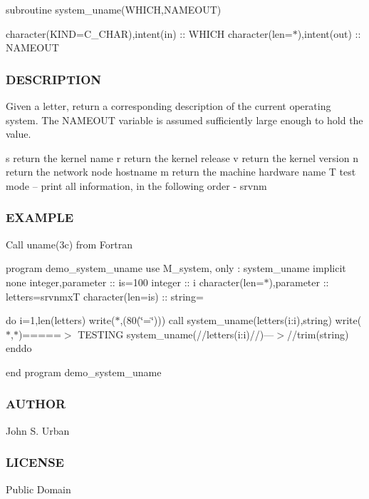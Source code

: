 subroutine system\+\_\+uname(\+W\+H\+I\+C\+H,\+N\+A\+M\+E\+O\+U\+T)

character(K\+I\+ND=C\+\_\+\+C\+H\+AR),intent(in) \+:\+: W\+H\+I\+CH character(len=$\ast$),intent(out) \+:\+: N\+A\+M\+E\+O\+UT \subsubsection*{D\+E\+S\+C\+R\+I\+P\+T\+I\+ON}

Given a letter, return a corresponding description of the current operating system. The N\+A\+M\+E\+O\+UT variable is assumed sufficiently large enough to hold the value.

s return the kernel name r return the kernel release v return the kernel version n return the network node hostname m return the machine hardware name T test mode -- print all information, in the following order -\/ srvnm

\subsubsection*{E\+X\+A\+M\+P\+LE}

Call uname(3c) from Fortran

program demo\+\_\+system\+\_\+uname use M\+\_\+system, only \+: system\+\_\+uname implicit none integer,parameter \+:\+: is=100 integer \+:\+: i character(len=$\ast$),parameter \+:\+: letters=\textquotesingle{}srvnmxT\textquotesingle{} character(len=is) \+:\+: string=\textquotesingle{} \textquotesingle{}

do i=1,len(letters) write($\ast$,\textquotesingle{}(80(\char`\"{}=\char`\"{}))\textquotesingle{}) call system\+\_\+uname(letters(i\+:i),string) write($\ast$,$\ast$)\textquotesingle{}=====$>$ T\+E\+S\+T\+I\+NG system\+\_\+uname(\textquotesingle{}//letters(i\+:i)//\textquotesingle{})---$>$\textquotesingle{}//trim(string) enddo

end program demo\+\_\+system\+\_\+uname \subsubsection*{A\+U\+T\+H\+OR}

John S. Urban \subsubsection*{L\+I\+C\+E\+N\+SE}

Public Domain \mbox{\label{namespacem__system_a14ce0b9177815bc357dbdf3778687bb7}} 
